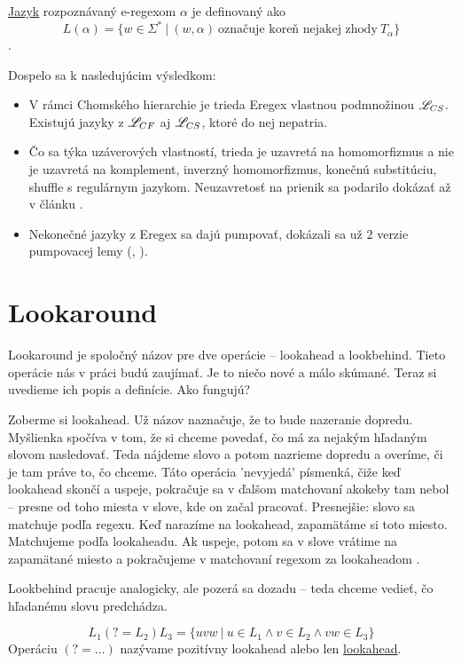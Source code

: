 \begin{df}
\underline{Jazyk} rozpoznávaný e-regexom $\alpha$ je definovaný ako
$$ L(\alpha) = \lbrace w \in \Sigma^* ~|~(w,\alpha ) ~\text{označuje~koreň~nejakej~zhody}~T_\alpha \rbrace $$.
\end{df}

Dospelo sa k nasledujúcim výsledkom:
\begin{itemize}
\item V rámci Chomského hierarchie je trieda Eregex vlastnou podmnožinou $\mathscr{L}_{CS}$. Existujú jazyky z $\mathscr{L}_{CF}$ aj $\mathscr{L}_{CS}$, ktoré do nej nepatria.
\item Čo sa týka uzáverových vlastností, trieda je uzavretá na homomorfizmus a nie je uzavretá na komplement, inverzný homomorfizmus, konečnú substitúciu, shuffle s regulárnym jazykom. Neuzavretosť na prienik sa podarilo dokázať až v článku \cite{ExtendedRegexIntersec}.
\item Nekonečné jazyky z Eregex sa dajú pumpovať, dokázali sa už 2 verzie pumpovacej lemy (\cite[Lemma 1]{ExtendedRegexPower}, \cite[Lemma 3]{ExtendedRegexIntersec}).
\end{itemize}

\section{Lookaround}
\label{dflookaround}

Lookaround je spoločný názov pre dve operácie -- lookahead a lookbehind. Tieto operácie nás v práci budú zaujímať. Je to niečo nové a málo skúmané. Teraz si uvedieme ich popis a definície. Ako fungujú? 

Zoberme si lookahead. Už názov naznačuje, že to bude nazeranie dopredu. Myšlienka spočíva v tom, že si chceme povedať, čo má za nejakým hľadaným slovom nasledovať. Teda nájdeme slovo a potom nazrieme dopredu a overíme, či je tam práve to, čo chceme. Táto operácia 'nevyjedá' písmenká, čiže keď lookahead skončí a uspeje, pokračuje sa v ďalšom matchovaní akokeby tam nebol -- presne od toho miesta v slove, kde on začal pracovať. Presnejšie: slovo sa matchuje podľa regexu. Keď narazíme na look\-ahead, zapamätáme si toto miesto. Matchujeme podľa lookaheadu. Ak uspeje, potom sa v slove vrátime na zapamätané miesto a pokračujeme v matchovaní regexom za lookaheadom \cite{Python3Documentation}.

Lookbehind pracuje analogicky, ale pozerá sa dozadu -- teda chceme vedieť, čo hľadanému slovu predchádza. 

\begin{df}
$$ L_{1}(?=L_{2})L_{3} = \lbrace uvw ~|~ u \in L_{1} \land v \in L_{2} \land vw \in L_{3} \rbrace $$ Operáciu $(?=\dots)$ nazývame pozitívny lookahead alebo len \underline{lookahead}.
\end{df}

